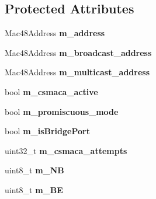 \subsection*{\-Protected \-Attributes}
\begin{DoxyCompactItemize}
\item 
\hypertarget{classns3_1_1PLC__Mac_a42dd0371196965bb9d1d0fb1ca7c6636}{\-Mac48\-Address {\bfseries m\-\_\-address}}\label{classns3_1_1PLC__Mac_a42dd0371196965bb9d1d0fb1ca7c6636}

\item 
\hypertarget{classns3_1_1PLC__Mac_a58102027886652c808e7670790841962}{\-Mac48\-Address {\bfseries m\-\_\-broadcast\-\_\-address}}\label{classns3_1_1PLC__Mac_a58102027886652c808e7670790841962}

\item 
\hypertarget{classns3_1_1PLC__Mac_a1b7dd1319e291def0f3bee91ff0591a9}{\-Mac48\-Address {\bfseries m\-\_\-multicast\-\_\-address}}\label{classns3_1_1PLC__Mac_a1b7dd1319e291def0f3bee91ff0591a9}

\item 
\hypertarget{classns3_1_1PLC__Mac_a6b7007e1b65915ebbeefeb429e6e4095}{bool {\bfseries m\-\_\-csmaca\-\_\-active}}\label{classns3_1_1PLC__Mac_a6b7007e1b65915ebbeefeb429e6e4095}

\item 
\hypertarget{classns3_1_1PLC__Mac_a0719536f0d86f13ec19fc7fe31e8bcf8}{bool {\bfseries m\-\_\-promiscuous\-\_\-mode}}\label{classns3_1_1PLC__Mac_a0719536f0d86f13ec19fc7fe31e8bcf8}

\item 
\hypertarget{classns3_1_1PLC__Mac_a014a94b2558746faea19bb9831cf318e}{bool {\bfseries m\-\_\-is\-Bridge\-Port}}\label{classns3_1_1PLC__Mac_a014a94b2558746faea19bb9831cf318e}

\item 
\hypertarget{classns3_1_1PLC__Mac_a76d7ccf00276e0659e6a357dceb63788}{uint32\-\_\-t {\bfseries m\-\_\-csmaca\-\_\-attempts}}\label{classns3_1_1PLC__Mac_a76d7ccf00276e0659e6a357dceb63788}

\item 
\hypertarget{classns3_1_1PLC__Mac_acfdf9bc2132f69830749e814bb19ec28}{uint8\-\_\-t {\bfseries m\-\_\-\-N\-B}}\label{classns3_1_1PLC__Mac_acfdf9bc2132f69830749e814bb19ec28}

\item 
\hypertarget{classns3_1_1PLC__Mac_a2e58031629d126abb98711661d2f517e}{uint8\-\_\-t {\bfseries m\-\_\-\-B\-E}}\label{classns3_1_1PLC__Mac_a2e58031629d126abb98711661d2f517e}


\end{DoxyCompactItemize}
